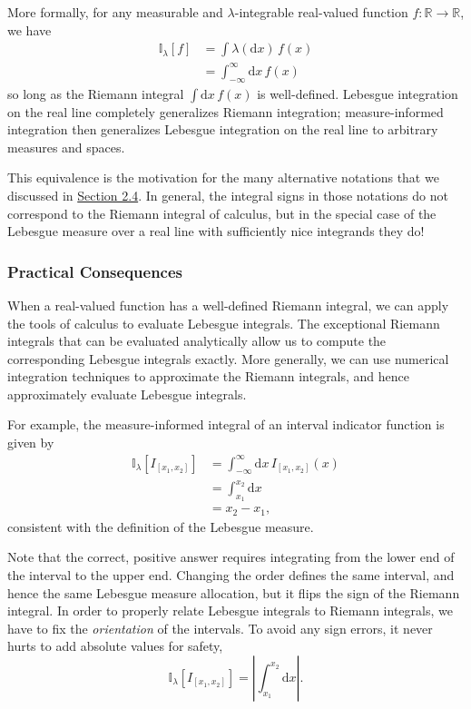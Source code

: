 \documentclass[
  letterpaper,
  DIV=11,
  numbers=noendperiod]{scrartcl}
\begin{document}
More formally, for any measurable and \(\lambda\)-integrable real-valued
function \(f: \mathbb{R} \rightarrow \mathbb{R}\), we have
\begin{align*}
\mathbb{I}_{\lambda}[f]
&= \int \lambda( \mathrm{d} x) \, f(x)
\\
&= \int_{-\infty}^{\infty} \mathrm{d} x \, f(x)
\end{align*} so long as the Riemann integral
\(\int \mathrm{d} x \, f(x)\) is well-defined. Lebesgue integration on
the real line completely generalizes Riemann integration;
measure-informed integration then generalizes Lebesgue integration on
the real line to arbitrary measures and spaces.

This equivalence is the motivation for the many alternative notations
that we discussed in \hyperref[sec:alt_notations]{Section 2.4}. In
general, the integral signs in those notations do not correspond to the
Riemann integral of calculus, but in the special case of the Lebesgue
measure over a real line with sufficiently nice integrands they do!

\subsubsection{Practical Consequences}\label{sec:practical_lebesgue}

When a real-valued function has a well-defined Riemann integral, we can
apply the tools of calculus to evaluate Lebesgue integrals. The
exceptional Riemann integrals that can be evaluated analytically allow
us to compute the corresponding Lebesgue integrals exactly. More
generally, we can use numerical integration techniques to approximate
the Riemann integrals, and hence approximately evaluate Lebesgue
integrals.

For example, the measure-informed integral of an interval indicator
function is given by \begin{align*}
\mathbb{I}_{\lambda}[I_{[x_{1}, x_{2}]}]
&=
\int_{-\infty}^{\infty} \mathrm{d} x \, I_{[x_{1}, x_{2}]}(x)
\\
&=
\int_{x_{1}}^{x_{2}} \mathrm{d} x
\\
&=
x_{2} - x_{1},
\end{align*} consistent with the definition of the Lebesgue measure.

Note that the correct, positive answer requires integrating from the
lower end of the interval to the upper end. Changing the order defines
the same interval, and hence the same Lebesgue measure allocation, but
it flips the sign of the Riemann integral. In order to properly relate
Lebesgue integrals to Riemann integrals, we have to fix the
\emph{orientation} of the intervals. To avoid any sign errors, it never
hurts to add absolute values for safety, \[
\mathbb{I}_{\lambda}[I_{[x_{1}, x_{2}]}]
=
\left| \int_{x_{1}}^{x_{2}} \mathrm{d} x \right|.
\]
\end{document}
